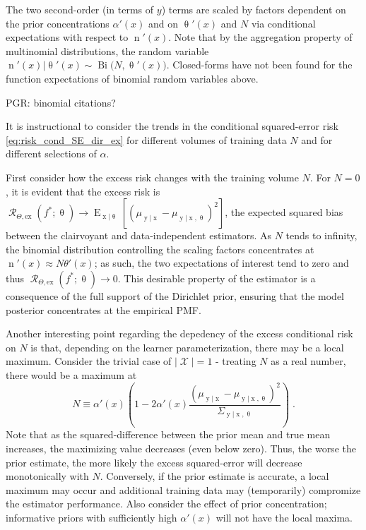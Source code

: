 \documentclass[12pt]{report}
\DeclareMathOperator{\xrm}{\mathrm{x}}
\DeclareMathOperator{\yrm}{\mathrm{y}}
\DeclareMathOperator{\nrm}{\mathrm{n}}
\DeclareMathOperator{\Erm}{\mathrm{E}}
\DeclareMathOperator{\Xcal}{\mathcal{X}}
\DeclareMathOperator{\Rcal}{\mathcal{R}}
\DeclareMathOperator{\Bi}{\mathrm{Bi}}
\begin{document}
The two second-order (in terms of $y$) terms are scaled by factors dependent on the prior concentrations $\alpha'(x)$ and on $\uptheta'(x)$ and $N$ via conditional expectations with respect to $\nrm'(x)$. Note that by the aggregation property of multinomial distributions, the random variable $\nrm'(x) | \uptheta'(x) \sim \Bi \big(N,\uptheta'(x)\big)$. Closed-forms have not been found for the function expectations of binomial random variables above.

PGR: binomial citations?

It is instructional to consider the trends in the conditional squared-error risk \eqref{eq:risk_cond_SE_dir_ex} for different volumes of training data $N$ and for different selections of $\alpha$.


First consider how the excess risk changes with the training volume $N$. For $N=0$, it is evident that the excess risk is $\Rcal_{\Theta, \mathrm{ex}}(f^* ; \uptheta) \to \Erm_{\xrm | \uptheta}\left[ \left( \mu_{\yrm | \xrm} - \mu_{\yrm | \xrm,\uptheta} \right)^2 \right]$,  the expected squared bias between the clairvoyant and data-independent estimators. As $N$ tends to infinity, the binomial distribution controlling the scaling factors  concentrates at $\nrm'(x) \approx N \theta'(x)$; as such, the two expectations of interest tend to zero and thus $\Rcal_{\Theta, \mathrm{ex}}(f^* ; \uptheta) \to 0$. This desirable property of the estimator is a consequence of the full support of the Dirichlet prior, ensuring that the model posterior concentrates at the empirical PMF.

Another interesting point regarding the depedency of the excess conditional risk on $N$ is that, depending on the learner parameterization, there may be a local maximum. Consider the trivial case of $|\Xcal| = 1$ - treating $N$ as a real number, there would be a maximum at 
\begin{equation}
N \equiv \alpha'(x) \left( 1 - 2 \alpha'(x) \frac{\left( \mu_{\yrm | \xrm} - \mu_{\yrm | \xrm,\uptheta} \right)^2}{\Sigma_{\yrm | \xrm,\uptheta}} \right) \;.
\end{equation}
Note that as the squared-difference between the prior mean and true mean increases, the maximizing value decreases (even below zero). Thus, the worse the prior estimate, the more likely the excess squared-error will decrease monotonically with $N$. Conversely, if the prior estimate is accurate, a local maximum may occur and additional training data may (temporarily) compromize the estimator performance. Also consider the effect of prior concentration; informative priors with sufficiently high $\alpha'(x)$ will not have the local maxima.
\end{document}
